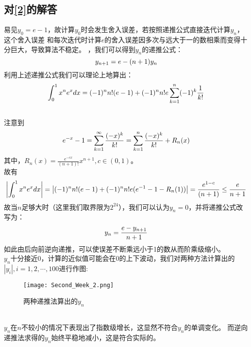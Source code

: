 \documentclass[a4paper,11pt,openany,notitlepage]{book}
\begin{document}
\subsection{对\ref{2}的解答}
易见$y_{0}=e-1$，故计算$y_{0}$时会发生舍入误差，若按照递推公式直接迭代计算$y_{n}$，这个舍入误差
和每次迭代时计算$e$的舍入误差因多次与远大于一的数相乘而变得十分巨大，导致算法不稳定。
，我们可以得到$y_{n}$的递推公式：
\begin{equation}
    y_{n+1}=e-(n+1)y_{n}\notag
\end{equation}
利用上述递推公式我们可以理论上地算出：
\begin{equation}
    \int_{0}^{1} x^{n}e^{x} dx = (-1)^n n! (e-1) + (-1)^n n! e \sum_{k=1}^{n} (-1)^k \frac{1}{k!} \notag
\end{equation}
\\注意到
\begin{equation}
    e^{-x}-1=\sum_{k=1}^{\infty}\frac{(-x)^k}{k!}=\sum_{k=1}^{n}\frac{(-x)^k}{k!} + R_{n}(x)\notag
\end{equation}
其中，$R_n(x) = \frac{e^{-cx} }{(n+1)!}x^{n+1},c\in(0,1)$。\\
故有
\begin{equation}
    \left|\int_{0}^{1} x^{n}e^{x} dx \right|= \left|(-1)^n n! (e-1) + (-1)^n n! e (e^{-1}-1-R_{n}(1))\right|
    = \frac{e^{1-c}}{(n+1)}
    \leq \frac{e}{n+1}\notag
\end{equation}
故当$n$足够大时（这里我们取界限为$2^{24}$），我们可以认为$y_{n}=0$，并将递推公式改写为：
\begin{equation}
    y_{n}=\frac{e-y_{n+1}}{n+1}\notag
\end{equation}
如此由后向前逆向递推，可以使误差不断乘远小于1的数从而阶乘级缩小。\\
$y_{n}$十分接近$0$，计算的近似值可能会在$0$的上下波动，我们对两种方法计算出的$\left|y_{i}\right|,i=1,2,\cdots,100$进行作图:
\begin{figure}[h]
    \centering
    \texttt{[image: Second\_Week\_2.png]}
    \caption{两种递推法算出的$y_{n}$}
    \label{pic 4}
\end{figure}
\\$y_{n}$在$n$不较小的情况下表现出了指数级增长，这显然不符合$y_{n}$的单调变化。
而逆向递推法求得的$y_{n}$始终平稳地减小，这是符合实际的。
\end{document}
